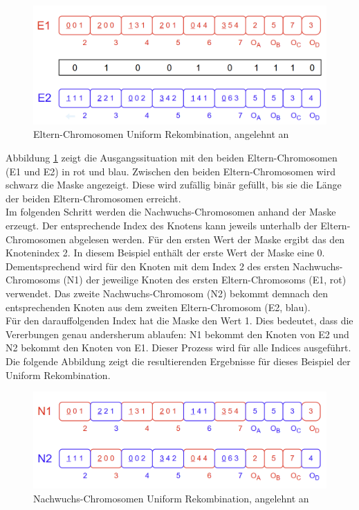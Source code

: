 \begin{figure}[H]
    \centering
    \includegraphics[scale = 0.45]{Bilder/BeispielUniformCrossover.png}
    \caption{Eltern-Chromosomen Uniform Rekombination, angelehnt an \cite{torabi_using_2022}}
    \label{fig:uniformCrossoverEltern}
\end{figure}

Abbildung \ref{fig:uniformCrossoverEltern} zeigt die Ausgangssituation mit den beiden Eltern-Chromosomen (E1 und E2) in rot und blau.
Zwischen den beiden Eltern-Chromosomen wird schwarz die Maske angezeigt.
Diese wird zufällig binär gefüllt, bis sie die Länge der beiden Eltern-Chromosomen erreicht.\\
Im folgenden Schritt werden die Nachwuchs-Chromosomen anhand der Maske erzeugt.
Der entsprechende Index des Knotens kann jeweils unterhalb der Eltern-Chromosomen abgelesen werden.
Für den ersten Wert der Maske ergibt das den Knotenindex 2.
In diesem Beispiel enthält der erste Wert der Maske eine 0.
Dementsprechend wird für den Knoten mit dem Index 2 des ersten Nachwuchs-Chromosoms (N1) der jeweilige Knoten des ersten Eltern-Chromosoms (E1, rot) verwendet.
Das zweite Nachwuchs-Chromosom (N2) bekommt demnach den entsprechenden Knoten aus dem zweiten Eltern-Chromosom (E2, blau).\\
Für den darauffolgenden Index hat die Maske den Wert 1.
Dies bedeutet, dass die Vererbungen genau andersherum ablaufen: N1 bekommt den Knoten von E2 und N2 bekommt den Knoten von E1.
Dieser Prozess wird für alle Indices ausgeführt.
Die folgende Abbildung zeigt die resultierenden Ergebnisse für dieses Beispiel der Uniform Rekombination.

\begin{figure}[H]
    \centering
    \includegraphics[scale = 0.45]{Bilder/BeispielUniformCrossover2.png}
    \caption{Nachwuchs-Chromosomen Uniform Rekombination, angelehnt an \cite{torabi_using_2022}}
    \label{fig:uniformCrossoverNachwuchs}
\end{figure}


